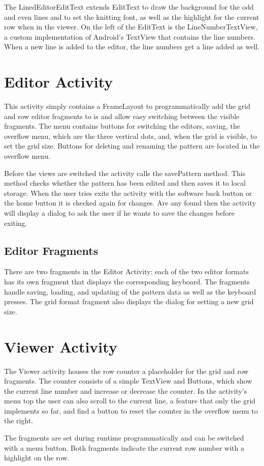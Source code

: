 The LinedEditorEditText extends EditText to draw the background for the odd and even lines and to set the knitting font, as well as the highlight for the current row when in the viewer. On the left of the EditText is the LineNumberTextView, a custom implementation of Android’s TextView that contains the line numbers. When a new line is added to the editor, the line numbers get a line added as well.

\section{Editor Activity}
This activity simply contains a FrameLayout to programmatically add the grid and row editor fragments to is and allow easy switching between the visible fragments. The menu contains buttons for switching the editors, saving, the overflow menu, which are the three vertical dots, and, when the grid is visible, to set the grid size. Buttons for deleting and renaming the pattern are located in the overflow menu.

Before the views are switched the activity calls the savePattern method. This method checks whether the pattern has been edited and then saves it to local storage.
When the user tries exits the activity with the software back button or the home button it is checked again for changes. Are any found then the activity will display a dialog to ask the user if he wants to save the changes before exiting.

\subsection{Editor Fragments}
There are two fragments in the Editor Activity: each of the two editor formats has its own fragment that displays the corresponding keyboard. The fragments handle saving, loading, and updating of the pattern data as well as the keyboard presses.
The grid format fragment also displays the dialog for setting a new grid size.

\section{Viewer Activity}
The Viewer activity houses the row counter a placeholder for the grid and row fragments. The counter consists of a simple TextView and Buttons, which show the current line number and increase or decrease the counter. In the activity’s menu top the user can also scroll to the current line, a feature that only the grid implements so far, and find a button to reset the counter in the overflow menu to the right.

The fragments are set during runtime programmatically and can be switched with a menu button. Both fragments indicate the current row number with a highlight on the row.